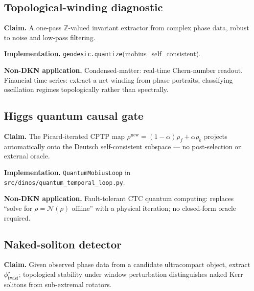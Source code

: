 \documentclass[11pt,a4paper]{article}
\theoremstyle{definition}
\newcommand{\phitwist}{\phi_{\mathrm{twist}}}
\begin{document}
\subsection{Topological-winding diagnostic}\label{nov:8}

\begin{tcolorbox}[noveltybox]
\textbf{Claim.} A one-pass $\mathbb{Z}$-valued invariant extractor
from complex phase data, robust to noise and low-pass filtering.
\end{tcolorbox}

\textbf{Implementation.} \texttt{geodesic.quantize}(mobius\_self\_consistent).

\begin{tcolorbox}[applbox]
\textbf{Non-DKN application.}
Condensed-matter: real-time Chern-number readout. Financial time
series: extract a net winding from phase portraits, classifying
oscillation regimes topologically rather than spectrally.
\end{tcolorbox}

\subsection{Higgs quantum causal gate}\label{nov:9}

\begin{tcolorbox}[noveltybox]
\textbf{Claim.} The Picard-iterated CPTP map
$\rho^{\mathrm{new}} = (1-\alpha)\rho_f + \alpha\rho_b$ projects
automatically onto the Deutsch self-consistent subspace --- no
post-selection or external oracle.
\end{tcolorbox}

\textbf{Implementation.} \texttt{QuantumMobiusLoop} in
\texttt{src/dinos/quantum\_temporal\_loop.py}.

\begin{tcolorbox}[applbox]
\textbf{Non-DKN application.}
Fault-tolerant CTC quantum computing: replaces ``solve for
$\rho = \mathcal{N}(\rho)$ offline'' with a physical iteration; no
closed-form oracle required.
\end{tcolorbox}

\subsection{Naked-soliton detector}\label{nov:10}

\begin{tcolorbox}[noveltybox]
\textbf{Claim.} Given observed phase data from a candidate ultracompact
object, extract $\phitwist^\star$; topological stability under window
perturbation distinguishes naked Kerr solitons from sub-extremal
rotators.
\end{tcolorbox}
\end{document}
